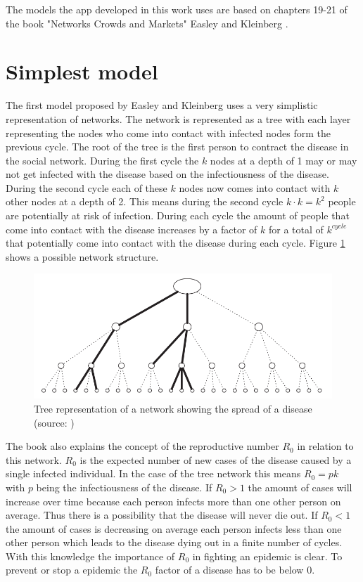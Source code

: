 The models the app developed in this work uses are based on chapters 19-21 of the book
"Networks Crowds and Markets" Easley and Kleinberg \cite{networks}.

\section{Simplest model}
The first model proposed by Easley and Kleinberg \cite{networks} uses a very simplistic
representation of networks. The network is represented as a tree with each layer representing
the nodes who come into contact with infected nodes form the previous cycle. The root
of the tree is the first person to contract the disease in the social network. During the
first cycle the $k$ nodes at a depth of 1 may or may not get infected with the disease based
on the infectiousness of the disease. During the second cycle each of these $k$ nodes
now comes into contact with $k$ other nodes at a depth of 2. This means during the second
cycle $k \cdot k = k^2$ people are potentially at risk of infection. During each cycle the
amount of people that come into contact with the disease increases by a factor of $k$ for
a total of $k^{cycle}$ that potentially come into contact with the disease during each cycle.
Figure \ref{fig:tree_network} shows a possible network structure.

\begin{figure}
    \centering
    \includegraphics[width=0.5\linewidth]{images/network_tree.png}
    \caption{Tree representation of a network showing the spread of a disease (source: \cite{networks})}
    \label{fig:tree_network}
\end{figure}

The book \cite{networks} also explains the concept of the reproductive number $R_0$ in
relation to this network. $R_0$ is the expected number of new cases of the disease
caused by a single infected individual. In the case of the tree network this means 
$R_0 = pk$ with $p$ being the infectiousness of the disease. If $R_0 > 1$ the amount
of cases will increase over time because each person infects more than one other person
on average. Thus there is a possibility that the disease will never
die out. If $R_0 < 1$ the amount of cases is decreasing on average each person infects less
than one other person which leads to the disease dying out in a finite number of cycles.
With this knowledge the importance of $R_0$ in fighting an epidemic is clear. To prevent
or stop a epidemic the $R_0$ factor of a disease has to be below 0.

